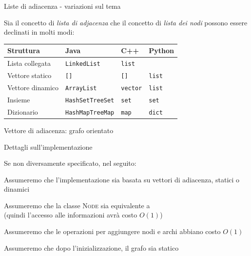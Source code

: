 \begin{frame}{Liste di adiacenza - variazioni sul tema}

Sia il concetto di \emph{lista di adjacenza} che il concetto di \emph{lista dei nodi} possono essere declinati in molti modi:

\bigskip
\centering
\begin{tabular}{|P{3cm}|P{2cm}|P{2cm}|P{2cm}|}
\hline
\textbf{Struttura} & \textbf{Java} &\textbf{C++}& \textbf{Python} \\\hline
Lista collegata & \texttt{LinkedList} & \texttt{list} & \\\hline
Vettore statico & \texttt{[]} & \texttt{[]} & \texttt{list} \\\hline
Vettore dinamico & \texttt{ArrayList} & \texttt{vector} & \texttt{list} \\\hline
Insieme & \texttt{HashSet}\newline\texttt{TreeSet} & \texttt{set} & \texttt{set} \\\hline
Dizionario & \texttt{HashMap}\newline \texttt{TreeMap} & \texttt{map} & \texttt{dict} \\\hline
\end{tabular}

\end{frame}




\begin{frame}{Vettore di adiacenza: grafo orientato}

\end{frame}


\begin{frame}{Dettagli sull'implementazione}

Se non diversamente specificato, nel seguito:
\BIL
\item Assumeremo che l'implementazione sia basata su vettori di adiacenza,
statici o dinamici
\item Assumeremo che la classe \textsc{Node} sia equivalente a \INTEGER \\
(quindi l'accesso alle informazioni avrà costo $O(1)$)
\item Assumeremo che le operazioni per aggiungere nodi e archi abbiano costo $O(1)$
\item Assumeremo che dopo l'inizializzazione, il grafo sia statico
\EIL

\end{frame}

